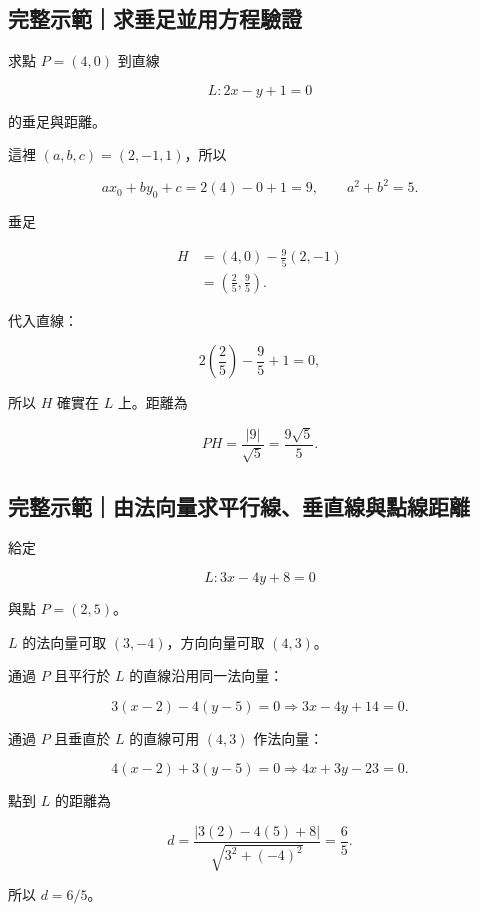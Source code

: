 \documentclass[11pt,a4paper]{article}
\begin{document}
\begin{HandoutWorkedExample}

\subsection{完整示範｜求垂足並用方程驗證}\label{ux5b8cux6574ux793aux7bc4ux6c42ux5782ux8db3ux4e26ux7528ux65b9ux7a0bux9a57ux8b49}

求點 \(P=(4,0)\) 到直線

\[
L:2x-y+1=0
\]

的垂足與距離。

這裡 \((a,b,c)=(2,-1,1)\)，所以

\[
ax_0+by_0+c=2(4)-0+1=9,
\qquad
a^2+b^2=5.
\]

垂足

\[
\begin{aligned}
H
&=(4,0)-\frac95(2,-1)\\
&=\boxed{\left(\frac25,\frac95\right)}.
\end{aligned}
\]

代入直線：

\[
2\left(\frac25\right)-\frac95+1=0,
\]

所以 \(H\) 確實在 \(L\) 上。距離為

\[
PH=\frac{|9|}{\sqrt5}
=\boxed{\frac{9\sqrt5}{5}}.
\]

\end{HandoutWorkedExample}

\begin{HandoutWorkedExample}

\subsection{完整示範｜由法向量求平行線、垂直線與點線距離}\label{ux5b8cux6574ux793aux7bc4ux7531ux6cd5ux5411ux91cfux6c42ux5e73ux884cux7ddaux5782ux76f4ux7ddaux8207ux9edeux7ddaux8dddux96e2}

給定

\[
L:3x-4y+8=0
\]

與點 \(P=(2,5)\)。

\(L\) 的法向量可取 \((3,-4)\)，方向向量可取 \((4,3)\)。

通過 \(P\) 且平行於 \(L\) 的直線沿用同一法向量：

\[
3(x-2)-4(y-5)=0
\Longrightarrow
\boxed{3x-4y+14=0}.
\]

通過 \(P\) 且垂直於 \(L\) 的直線可用 \((4,3)\) 作法向量：

\[
4(x-2)+3(y-5)=0
\Longrightarrow
\boxed{4x+3y-23=0}.
\]

點到 \(L\) 的距離為

\[
d=\frac{|3(2)-4(5)+8|}{\sqrt{3^2+(-4)^2}}
=\frac6{5}.
\]

所以 \(\boxed{d=6/5}\)。

\end{HandoutWorkedExample}
\end{document}
